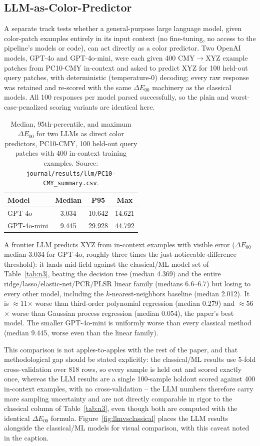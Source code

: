 \documentclass[11pt,a4paper]{article}
\begin{document}
\subsection{LLM-as-Color-Predictor}
\label{sec:llm}

A separate track tests whether a general-purpose large language model,
given color-patch examples entirely in its input context (no fine-tuning,
no access to the pipeline's models or code), can act directly as a color
predictor. Two OpenAI models, GPT-4o and GPT-4o-mini, were each given 400
CMY$\to$XYZ example patches from PC10-CMY in-context and asked to predict
XYZ for 100 held-out query patches, with deterministic (temperature-0)
decoding; every raw response was retained and re-scored with the same
$\Delta E_{00}$ machinery as the classical models. All 100 responses per
model parsed successfully, so the plain and worst-case-penalized scoring
variants are identical here.

\begin{table}[h]
\centering
\caption{Median, 95th-percentile, and maximum $\Delta E_{00}$ for two LLMs
as direct color predictors, PC10-CMY, 100 held-out query patches with 400
in-context training examples. Source:
\texttt{journal/results/llm/PC10-CMY\_summary.csv}.}
\label{tab:llm}
\begin{tabular}{@{}lccc@{}}
\toprule
Model & Median & P95 & Max \\
\midrule
GPT-4o & 3.034 & 10.642 & 14.621 \\
GPT-4o-mini & 9.445 & 29.928 & 44.792 \\
\bottomrule
\end{tabular}
\end{table}

A frontier LLM predicts XYZ from in-context examples with visible error
($\Delta E_{00}$ median 3.034 for GPT-4o, roughly three times the
just-noticeable-difference threshold): it lands mid-field against the
classical/ML model set of Table~\ref{tab:n3}, beating the decision tree
(median 4.369) and the entire ridge/lasso/elastic-net/PCR/PLSR linear family
(medians 6.6--6.7) but losing to every other model, including the
$k$-nearest-neighbors baseline (median 2.012). It is $\approx$11$\times$
worse than third-order polynomial regression (median 0.279) and
$\approx$56$\times$ worse than Gaussian process regression (median 0.054),
the paper's best model. The smaller GPT-4o-mini is uniformly worse than
every classical method (median 9.445, worse even than the linear family).

This comparison is not apples-to-apples with the rest of the paper, and that
methodological gap should be stated explicitly: the classical/ML results use
5-fold cross-validation over 818 rows, so every sample is held out and
scored exactly once, whereas the LLM results are a single 100-sample
holdout scored against 400 in-context examples, with no cross-validation --
the LLM numbers therefore carry more sampling uncertainty and are not
directly comparable in rigor to the classical column of Table~\ref{tab:n3},
even though both are computed with the identical $\Delta E_{00}$ formula.
Figure~\ref{fig:llmvsclassical} places the LLM results alongside the
classical/ML models for visual comparison, with this caveat noted in the
caption.
\end{document}
